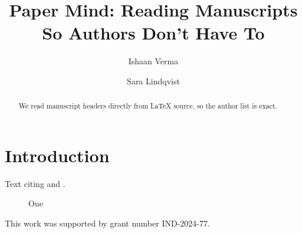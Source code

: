 \documentclass[sigconf]{acmart}
\begin{document}
\title{Paper Mind: Reading Manuscripts So Authors Don't Have To}
\author{Ishaan Verma}
\author{Sara Lindqvist}
\begin{abstract}
We read manuscript headers directly from LaTeX source, so the author list is exact.
\end{abstract}
\maketitle
\section{Introduction}
Text citing \cite{smith2020,lee2021} and \cite{smith2020}.
\begin{figure}\caption{One}\end{figure}
\begin{table}\caption{Two}\end{table}
\begin{acks}
This work was supported by grant number IND-2024-77.
\end{acks}

\end{document}
